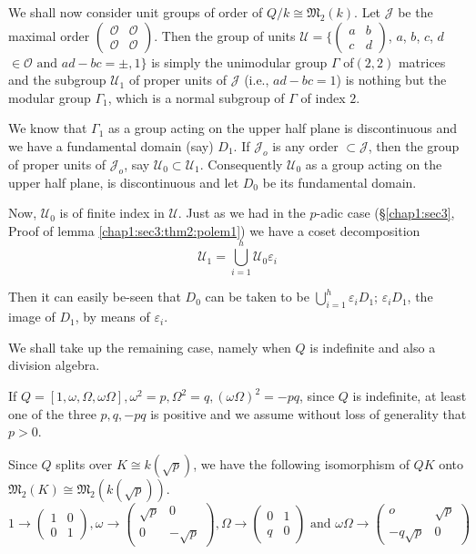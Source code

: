 We shall now consider unit groups of order of $Q/ k \cong
\mathfrak{M}_2(k)$. Let $\mathcal{J}$ be the maximal order
$\begin{pmatrix} \mathscr{O} & \mathscr{O} \\ \mathscr{O} &
  \mathscr{O} \end{pmatrix}$. Then the group of units $\mathscr{U}=
\Bigg\{ \begin{pmatrix} a & b \\ c & d \end{pmatrix}$, $a$, $b$, $c$, $d$ $\in
\mathscr{O} \text{ and } ad-bc= \pm, 1 \Bigg\}$ is simply the
unimodular group $\Gamma$ of\pageoriginale $(2,2)$ matrices and the subgroup
$\mathscr{U}_1$ of proper units of $\mathcal{J}$ (i.e., $ad-bc=1$) is
nothing but the modular group $\Gamma_1$, which is a normal subgroup
of $\Gamma$ of index $2$. 

We know that $\Gamma_1$ as a group acting on the upper half plane is
discontinuous and we have a fundamental domain (say) $D_1$. If
$\mathcal{J}_o$ is any  order $\subset \mathcal{J}$, then the group of
proper units of $\mathcal{J}_o$, say $\mathscr{U}_0 \subset
\mathscr{U}_1$. Consequently $\mathscr{U}_0$ as a group acting on the
upper half plane, is discontinuous and let $D_0$ be its fundamental
domain. 

Now, $\mathscr{U}_0 $ is of finite index in $\mathscr{U}$. Just as we
had in the $p$-adic case (\S \ref{chap1:sec3}, Proof of
lemma \ref{chap1:sec3:thm2:polem1}) we have a coset
decomposition  
$$
\mathscr{U}_1 = \bigcup^h_{i=1} \mathscr{U}_0 \varepsilon_i
$$

Then it can easily be-seen that $D_0$ can be taken to be
$\bigcup\limits_{i=1}^h \varepsilon_i D_1$;  $\varepsilon_i D_1$, the
image of $D_1$, by means of $\varepsilon_i$. 

We shall take up the remaining case, namely when $Q$ is indefinite and
also a division algebra. 

If $Q=[1, \omega, \Omega, \omega \Omega], \omega^2 = p, \Omega^2 =q,
(\omega \Omega)^2=- pq$, since $Q$ is indefinite, at least one of the
three $p,q, -pq$ is positive and we assume without loss of generality
that $p > 0$. 

Since $Q$ splits over $K \cong k(\sqrt{p})$, we have the following
isomorphism of $QK$ onto $\mathfrak{M}_2(K) \cong \mathfrak{M}_2
(k(\sqrt{p}))$. 
{\fontsize{10pt}{12pt}\selectfont
$$
1 \rightarrow 
\begin{pmatrix} 
  1 & 0 \\ 0 & 1
\end{pmatrix},
\omega \to 
\begin{pmatrix}
  \sqrt{p} & 0 \\
  0 & -\sqrt{p}
\end{pmatrix}, 
\Omega \to 
\begin{pmatrix}
  0 & 1 \\ q  & 0
\end{pmatrix}
\text{\ and\ } \omega \Omega \to 
\begin{pmatrix}
  o & \sqrt{p} \\
  -q \sqrt{p} & 0
\end{pmatrix}    
$$}\relax




